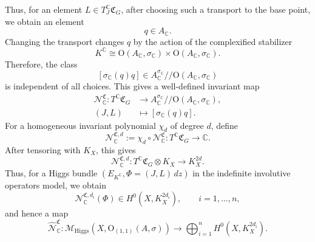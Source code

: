 \documentclass[oneside,11pt]{amsart}
\theoremstyle{definition}
\theoremstyle{remark}
\numberwithin{thm}{section}
\numberwithin{equation}{section}
\begin{document}
 Thus, for an element $L\in T_J^{\mathbb{C}}\mathfrak{C}_G$, after choosing such a transport to the base point, we obtain an element
\[
q\in A_{\mathbb{C}}.
\]
Changing the transport changes $q$ by the action of the complexified stabilizer
\[
K^{\mathbb{C}}\cong\mathrm{O}(A_{\mathbb{C}},\sigma_{\mathbb{C}})\times\mathrm{O}(A_{\mathbb{C}},\sigma_{\mathbb{C}}).
\]
Therefore, the class
\[
[\sigma_{\mathbb{C}}(q)q]\in A_{\mathbb{C}}^{\sigma_{\mathbb{C}}}/\!\!/\mathrm{O}(A_{\mathbb{C}},\sigma_{\mathbb{C}})
\]
is independent of all choices. This gives a well-defined invariant map
\begin{align*}
    \mathcal{N}_{\mathbb{C}}^{\mathfrak C}: T^{\mathbb{C}}\mathfrak{C}_G&\longrightarrow A_{\mathbb{C}}^{\sigma_{\mathbb{C}}}/\!\!/\mathrm{O}(A_{\mathbb{C}},\sigma_{\mathbb{C}}),\\
    (J,L)&\longmapsto[\sigma_{\mathbb{C}}(q)q].
\end{align*}
For a homogeneous invariant polynomial $\chi_d$ of degree $d$, define
\[
\mathcal{N}_{\mathbb{C}}^{\mathfrak C,d} := \chi_d\circ \mathcal N_{\mathbb{C}}^{\mathfrak C}: T^{\mathbb{C}}\mathfrak{C}_G\longrightarrow\mathbb{C}.
\]
After tensoring with $K_X$, this gives
\[
\mathcal{N}_{\mathbb{C}}^{\mathfrak C,d}: T^{\mathbb{C}}\mathfrak C_G\otimes K_X \longrightarrow K_X^{2d}.
\]
Thus, for a Higgs bundle $(E_{K^{\mathbb{C}}},\Phi=(J,L)\,dz)$ in the indefinite involutive operators model, we obtain
\[
\mathcal{N}_{\mathbb{C}}^{\mathfrak C,d_i}(\Phi)\in H^0(X,K_X^{2d_i}), \qquad i=1,\ldots,n,
\]
and hence a map
\[
\hat{\mathcal N}_{\mathbb{C}}^{\mathfrak C}: \mathcal M_{\mathrm{Higgs}}(X,\mathrm{O}_{(1,1)}(A,\sigma))
\longrightarrow \bigoplus_{i=1}^{n}H^0(X,K_X^{2d_i}).
\]

\vspace{2mm}
\end{document}
